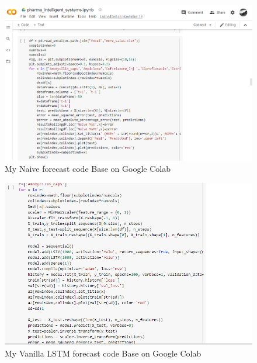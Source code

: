 \documentclass[12pt]{report}
\begin{document}
\begin{figure}[H]%
  \begin {center}
  \includegraphics[width=1\textwidth]{images/NaiveCode.PNG}
  \caption{My Naive forecast code Base on Google Colab}
  \label{fig:ecg}
  \end {center}
\end{figure}
  
\begin{figure}[H]%
  \begin {center}
  \includegraphics[width=1\textwidth]{images/VanillaLSTM.PNG}
  \caption{My Vanilla LSTM forecast code Base on Google Colab}
  \label{fig:ecg}
  \end {center}
\end{figure}
\end{document}
